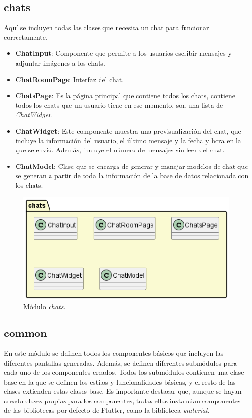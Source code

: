 \documentclass[a4paper, 12pt]{article}
\begin{document}
\subsection*{chats}

Aquí se incluyen todas las clases que necesita un chat para funcionar correctamente.
\begin{itemize}[noitemsep]
	\item \textbf{ChatInput}: Componente que permite a los usuarios escribir mensajes y adjuntar imágenes a los chats.
	\item \textbf{ChatRoomPage}: Interfaz del chat.
	\item \textbf{ChatsPage}:  Es la página principal que contiene todos los chats, contiene todos los chats que un usuario tiene en ese momento, son una lista de \textit{ChatWidget}.
	\item \textbf{ChatWidget}: Este componente muestra una previsualización del chat, que incluye la información del usuario, el último mensaje y  la fecha y hora en la que se envió. Además, incluye el número de mensajes sin leer del chat.
	\item \textbf{ChatModel}: Clase que se encarga de generar y manejar modelos de chat que se generan a partir de toda la información de la base de datos relacionada con los chats.
\end{itemize}

\begin{figure}[H]
	\begin{center}
		{\includegraphics[width=0.7\linewidth]{diagram/Chats.png}\par}
		\caption{Módulo \textit{chats}.}
	\end{center}
\end{figure}


\subsection*{common}

En este módulo se definen todos los componentes básicos que incluyen las diferentes pantallas generadas. Además, se definen diferentes submódulos para cada uno de los componentes creados. Todos los submódulos contienen una clase base en la que se definen los estilos y funcionalidades básicas, y el resto de las clases extienden estas clases base. Es importante destacar que, aunque se hayan creado clases propias para los componentes, todas ellas instancian componentes de las bibliotecas por defecto de Flutter, como la biblioteca \textit{material}.
\end{document}
